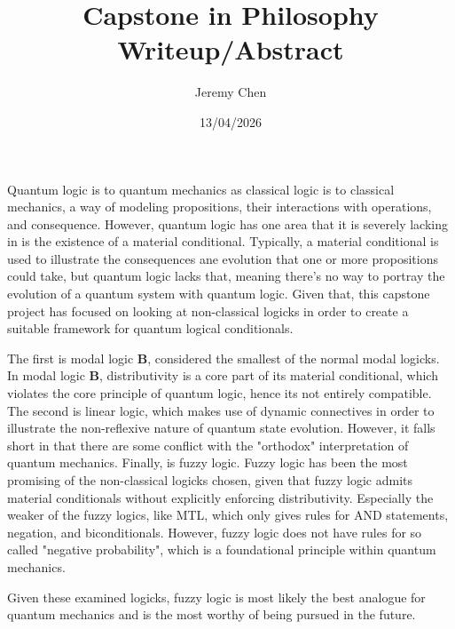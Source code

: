 \documentclass[10pt,letterpaper]{article}
\title{Capstone in Philosophy Writeup/Abstract}
\author{Jeremy Chen}
\date{13/04/2026}
\begin{document}
	\maketitle

Quantum logic is to quantum mechanics as classical logic is to classical mechanics, a way of modeling propositions, their interactions with operations, and consequence. However, quantum logic has one area that it is severely lacking in is the existence of a material conditional. Typically, a material conditional is used to illustrate the consequences ane evolution that one or more propositions could take, but quantum logic lacks that, meaning there's no way to portray the evolution of a quantum system with quantum logic. Given that, this capstone project has focused on looking at non-classical logicks in order to create a suitable framework for quantum logical conditionals. 

The first is modal logic \textbf{B}, considered the smallest of the normal modal logicks. In modal logic \textbf{B}, distributivity is a core part of its material conditional, which violates the core principle of quantum logic, hence its not entirely compatible. The second is linear logic, which makes use of dynamic connectives in order to illustrate the non-reflexive nature of quantum state evolution. However, it falls short in that there are some conflict with the "orthodox" interpretation of quantum mechanics. Finally, is fuzzy logic. Fuzzy logic has been the most promising of the non-classical logicks chosen, given that fuzzy logic admits material conditionals without explicitly enforcing distributivity. Especially the weaker of the fuzzy logics, like MTL, which only gives rules for AND statements, negation, and biconditionals. However, fuzzy logic does not have rules for so called "negative probability", which is a foundational principle within quantum mechanics. 

Given these examined logicks, fuzzy logic is most likely the best analogue for quantum mechanics and is the most worthy of being pursued in the future. 
\end{document}
